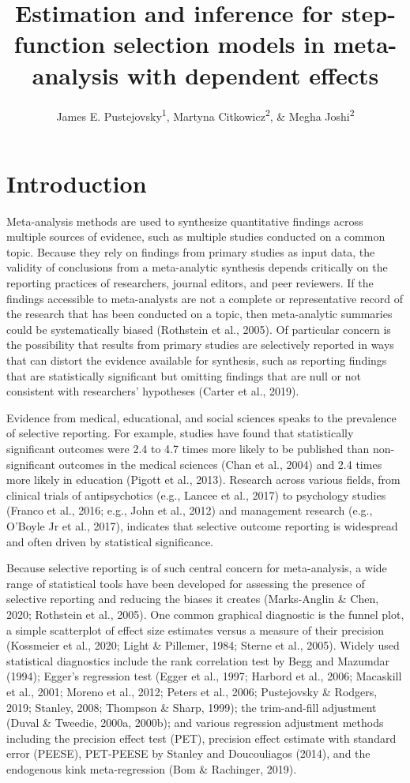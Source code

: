 \documentclass[
  man, donotrepeattitle,floatsintext]{apa7}
\title{Estimation and inference for step-function selection models in meta-analysis with dependent effects}
\author{James E. Pustejovsky\textsuperscript{1}, Martyna Citkowicz\textsuperscript{2}, \& Megha Joshi\textsuperscript{2}}
\date{}
\affiliation{\vspace{0.5cm}\textsuperscript{1} University of Wisconsin-Madison\\\textsuperscript{2} American Institutes for Research}
\begin{document}
\maketitle

\section{Introduction}\label{introduction}

Meta-analysis methods are used to synthesize quantitative findings across multiple sources of evidence, such as multiple studies conducted on a common topic.
Because they rely on findings from primary studies as input data, the validity of conclusions from a meta-analytic synthesis depends critically on the reporting practices of researchers, journal editors, and peer reviewers.
If the findings accessible to meta-analysts are not a complete or representative record of the research that has been conducted on a topic, then meta-analytic summaries could be systematically biased (Rothstein et al., 2005).
Of particular concern is the possibility that results from primary studies are selectively reported in ways that can distort the evidence available for synthesis, such as reporting findings that are statistically significant but omitting findings that are null or not consistent with researchers' hypotheses (Carter et al., 2019).

Evidence from medical, educational, and social sciences speaks to the prevalence of selective reporting. For example, studies have found that statistically significant outcomes were 2.4 to 4.7 times more likely to be published than non-significant outcomes in the medical sciences (Chan et al., 2004) and 2.4 times more likely in education (Pigott et al., 2013). Research across various fields, from clinical trials of antipsychotics (e.g., Lancee et al., 2017) to psychology studies (Franco et al., 2016; e.g., John et al., 2012) and management research (e.g., O'Boyle Jr et al., 2017), indicates that selective outcome reporting is widespread and often driven by statistical significance.

Because selective reporting is of such central concern for meta-analysis, a wide range of statistical tools have been developed for assessing the presence of selective reporting and reducing the biases it creates (Marks‐Anglin \& Chen, 2020; Rothstein et al., 2005).
One common graphical diagnostic is the funnel plot, a simple scatterplot of effect size estimates versus a measure of their precision (Kossmeier et al., 2020; Light \& Pillemer, 1984; Sterne et al., 2005). Widely used statistical diagnostics include the rank correlation test by Begg and Mazumdar (1994); Egger's regression test (Egger et al., 1997; Harbord et al., 2006; Macaskill et al., 2001; Moreno et al., 2012; Peters et al., 2006; Pustejovsky \& Rodgers, 2019; Stanley, 2008; Thompson \& Sharp, 1999); the trim-and-fill adjustment (Duval \& Tweedie, 2000a, 2000b); and various regression adjustment methods including the precision effect test (PET), precision effect estimate with standard error (PEESE), PET-PEESE by Stanley and Doucouliagos (2014), and the endogenous kink meta-regression (Bom \& Rachinger, 2019).
\end{document}
